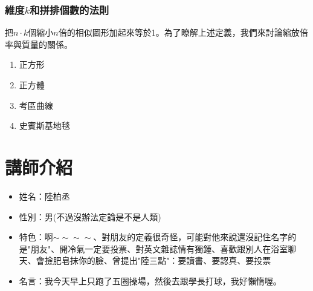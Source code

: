 \subsubsection{維度$k$和拼排個數的法則}
把$n \cdot k$個縮小$n$倍的相似圖形加起來等於1。為了瞭解上述定義，我們來討論縮放倍率與質量的關係。
\begin{enumerate}
\item 正方形 \\

\item 正方體 \\

\item 考區曲線 \\

\item 史賓斯基地毯 \\

\end{enumerate}

\section{講師介紹}
\begin{itemize}
\item 姓名：陸柏丞
\item 性別：男(不過沒辦法定論是不是人類)
\item 特色：啊$\sim\sim\sim\sim$、對朋友的定義很奇怪，可能對他來說還沒記住名字的是"朋友"、開冷氣一定要投票、對英文雜誌情有獨鍾、喜歡跟別人在浴室聊天、會撿肥皂抹你的臉、曾提出"陸三點"：要讀書、要認真、要投票
\item 名言：我今天早上只跑了五圈操場，然後去跟學長打球，我好懶惰喔。
\end{itemize}
